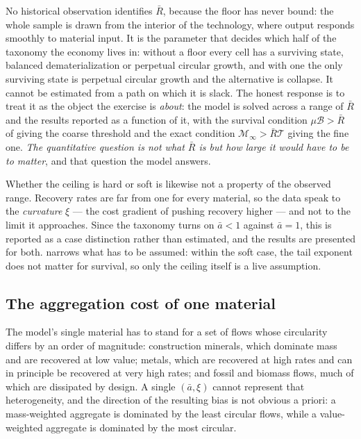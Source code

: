  No historical observation identifies $\bar R$, because the floor has never bound: the whole sample is drawn from the interior of the technology, where output responds smoothly to material input. It is the parameter that decides which half of the taxonomy the economy lives in: without a floor every cell has a surviving state, balanced dematerialization or perpetual circular growth, and with one the only surviving state is perpetual circular growth and the alternative is collapse. It cannot be estimated from a path on which it is slack. The honest response is to treat it as the object the exercise is \emph{about}: the model is solved across a range of $\bar R$ and the results reported as a function of it, with the survival condition $\mu\mathcal B>\bar R$ of  giving the coarse threshold and the exact condition $\mathcal M_\infty>\bar R\mathcal T$ giving the fine one. \emph{The quantitative question is not what $\bar R$ is but how large it would have to be to matter}, and that question the model answers.

 Whether the ceiling is hard or soft is likewise not a property of the observed range. Recovery rates are far from one for every material, so the data speak to the \emph{curvature} $\xi$ --- the cost gradient of pushing recovery higher --- and not to the limit it approaches. Since the taxonomy turns on $\bar a<1$ against $\bar a=1$, this is reported as a case distinction rather than estimated, and the results are presented for both.  narrows what has to be assumed: within the soft case, the tail exponent does not matter for survival, so only the ceiling itself is a live assumption.

\subsection{The aggregation cost of one material}\label{sec:q:cal:aggregation}

The model's single material has to stand for a set of flows whose circularity differs by an order of magnitude: construction minerals, which dominate mass and are recovered at low value; metals, which are recovered at high rates and can in principle be recovered at very high rates; and fossil and biomass flows, much of which are dissipated by design. A single $\left(\bar a,\xi\right)$ cannot represent that heterogeneity, and the direction of the resulting bias is not obvious a priori: a mass-weighted aggregate is dominated by the least circular flows, while a value-weighted aggregate is dominated by the most circular.


